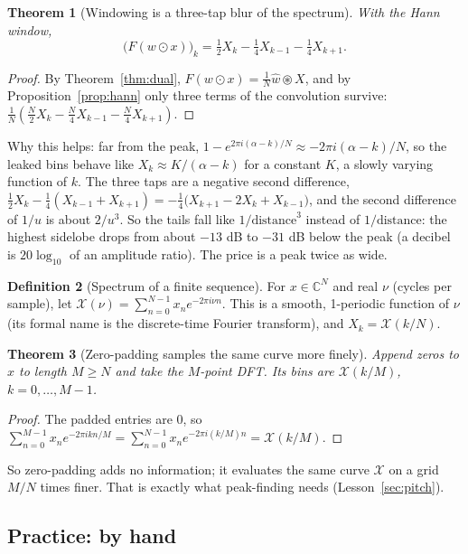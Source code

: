 \documentclass[11pt]{article}
\newtheorem{theorem}{Theorem}[section]
\theoremstyle{definition}
\newtheorem{definition}[theorem]{Definition}
\newcommand{\C}{\mathbb{C}}
\newcommand{\cconv}{\circledast}
\begin{document}
\begin{theorem}[Windowing is a three-tap blur of the spectrum]\label{thm:hannblur}
With the Hann window,
\[
\big(F(w\odot x)\big)_k=\tfrac12X_k-\tfrac14X_{k-1}-\tfrac14X_{k+1}.
\]
\end{theorem}
\begin{proof}
By Theorem~\ref{thm:dual}, $F(w\odot x)=\frac1N\hat w\cconv X$, and by
Proposition~\ref{prop:hann} only three terms of the convolution survive:
$\frac1N(\frac N2X_k-\frac N4X_{k-1}-\frac N4X_{k+1})$.
\end{proof}

Why this helps: far from the peak, $1-e^{2\pi i(\alpha-k)/N}\approx-2\pi i(\alpha-k)/N$,
so the leaked bins behave like $X_k\approx K/(\alpha-k)$ for a constant $K$, a slowly
varying function of $k$. The three taps are a negative second difference,
$\frac12X_k-\frac14(X_{k-1}+X_{k+1})=-\frac14\big(X_{k+1}-2X_k+X_{k-1}\big)$, and the
second difference of $1/u$ is about $2/u^3$. So the tails fall like $1/\text{distance}^3$
instead of $1/\text{distance}$: the highest sidelobe drops from about $-13$ dB to $-31$ dB
below the peak (a decibel is $20\log_{10}$ of an amplitude ratio). The price is a peak
twice as wide.

\begin{definition}[Spectrum of a finite sequence]
For $x\in\C^N$ and real $\nu$ (cycles per sample), let
$\mathcal X(\nu)=\sum_{n=0}^{N-1}x_ne^{-2\pi i\nu n}$. This is a smooth, 1-periodic
function of $\nu$ (its formal name is the discrete-time Fourier transform), and
$X_k=\mathcal X(k/N)$.
\end{definition}

\begin{theorem}[Zero-padding samples the same curve more finely]\label{thm:zeropad}
Append zeros to $x$ to length $M\ge N$ and take the $M$-point DFT. Its bins are
$\mathcal X(k/M)$, $k=0,\dots,M-1$.
\end{theorem}
\begin{proof}
The padded entries are 0, so $\sum_{n=0}^{M-1}x_ne^{-2\pi ikn/M}
=\sum_{n=0}^{N-1}x_ne^{-2\pi i(k/M)n}=\mathcal X(k/M)$.
\end{proof}

So zero-padding adds no information; it evaluates the same curve $\mathcal X$ on a grid
$M/N$ times finer. That is exactly what peak-finding needs (Lesson~\ref{sec:pitch}).

\subsection{Practice: by hand}
\end{document}
